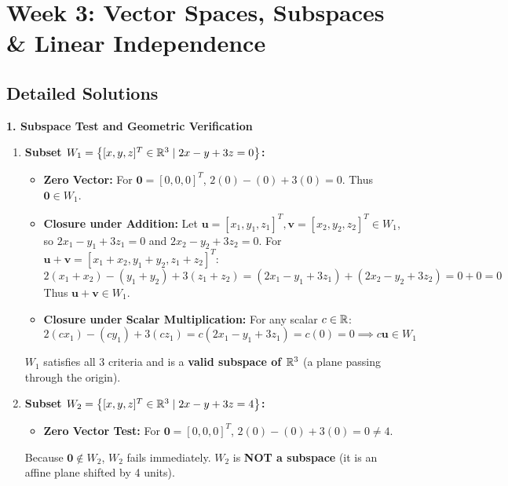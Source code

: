 \section*{Week 3: Vector Spaces, Subspaces \& Linear Independence}

\subsection*{Detailed Solutions}

\textbf{1. Subspace Test and Geometric Verification}
\begin{enumerate}
    \item \textbf{Subset $W_1 = \left\{ [x, y, z]^T \in \mathbb{R}^3 \mid 2x - y + 3z = 0 \right\}$:}
    \begin{itemize}
        \item \textbf{Zero Vector:} For $\mathbf{0} = [0, 0, 0]^T$, $2(0) - (0) + 3(0) = 0$. Thus $\mathbf{0} \in W_1$.
        \item \textbf{Closure under Addition:} Let $\mathbf{u} = [x_1, y_1, z_1]^T, \mathbf{v} = [x_2, y_2, z_2]^T \in W_1$, so $2x_1 - y_1 + 3z_1 = 0$ and $2x_2 - y_2 + 3z_2 = 0$.
        For $\mathbf{u} + \mathbf{v} = [x_1 + x_2, y_1 + y_2, z_1 + z_2]^T$:
        \begin{equation*}
        2(x_1 + x_2) - (y_1 + y_2) + 3(z_1 + z_2) = (2x_1 - y_1 + 3z_1) + (2x_2 - y_2 + 3z_2) = 0 + 0 = 0
        \end{equation*}
        Thus $\mathbf{u} + \mathbf{v} \in W_1$.
        \item \textbf{Closure under Scalar Multiplication:} For any scalar $c \in \mathbb{R}$:
        \begin{equation*}
        2(cx_1) - (cy_1) + 3(cz_1) = c(2x_1 - y_1 + 3z_1) = c(0) = 0 \implies c\mathbf{u} \in W_1
        \end{equation*}
    \end{itemize}
    $W_1$ satisfies all 3 criteria and is a \textbf{valid subspace of $\mathbb{R}^3$} (a plane passing through the origin).

    \item \textbf{Subset $W_2 = \left\{ [x, y, z]^T \in \mathbb{R}^3 \mid 2x - y + 3z = 4 \right\}$:}
    \begin{itemize}
        \item \textbf{Zero Vector Test:} For $\mathbf{0} = [0, 0, 0]^T$, $2(0) - (0) + 3(0) = 0 \neq 4$.
    \end{itemize}
    Because $\mathbf{0} \notin W_2$, $W_2$ fails immediately. $W_2$ is \textbf{NOT a subspace} (it is an affine plane shifted by 4 units).


\end{enumerate}

